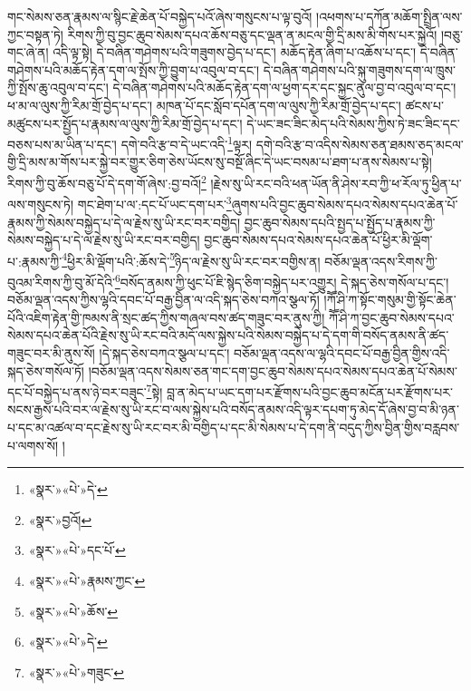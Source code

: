 གང་སེམས་ཅན་རྣམས་ལ་སྙིང་རྗེ་ཆེན་པོ་བསྐྱེད་པའོ་ཞེས་གསུངས་པ་ལྟ་བུའོ། །འཕགས་པ་དཀོན་མཆོག་སྤྲིན་ལས་ཀྱང་བསྟན་ཏེ། རིགས་ཀྱི་བུ་བྱང་ཆུབ་སེམས་དཔའ་ཆོས་བཅུ་དང་ལྡན་ན་མངལ་གྱི་དྲི་མས་མི་གོས་པར་སྐྱེའོ། །བཅུ་གང་ཞེ་ན། འདི་ལྟ་སྟེ། དེ་བཞིན་གཤེགས་པའི་གཟུགས་བྱེད་པ་དང་། མཆོད་རྟེན་ཞིག་པ་འཆོས་པ་དང་། དེ་བཞིན་གཤེགས་པའི་མཆོད་རྟེན་དག་ལ་སྤོས་ཀྱི་བྱུག་པ་འབུལ་བ་དང་། དེ་བཞིན་གཤེགས་པའི་སྐུ་གཟུགས་དག་ལ་ཁྲུས་ཀྱི་སྤོས་ཆུ་འབུལ་བ་དང་། དེ་བཞིན་གཤེགས་པའི་མཆོད་རྟེན་དག་ལ་ཕྱག་དར་དང་སྐྱང་ནུལ་བྱ་བ་འབུལ་བ་དང་། ཕ་མ་ལ་ལུས་ཀྱི་རིམ་གྲོ་བྱེད་པ་དང་། མཁན་པོ་དང་སློབ་དཔོན་དག་ལ་ལུས་ཀྱི་རིམ་གྲོ་བྱེད་པ་དང་། ཚངས་པ་མཚུངས་པར་སྤྱོད་པ་རྣམས་ལ་ལུས་ཀྱི་རིམ་གྲོ་བྱེད་པ་དང་། དེ་ཡང་ཟང་ཟིང་མེད་པའི་སེམས་ཀྱིས་ཏེ་ཟང་ཟིང་དང་བཅས་པས་མ་ཡིན་པ་དང་། དགེ་བའི་རྩ་བ་དེ་ཡང་འདི་\footnote{«སྣར་»«པེ་»དེ་}ལྟར། དགེ་བའི་རྩ་བ་འདིས་སེམས་ཅན་ཐམས་ཅད་མངལ་གྱི་དྲི་མས་མ་གོས་པར་སྐྱེ་བར་གྱུར་ཅིག་ཅེས་ཡོངས་སུ་བསྔོ་ཞིང་དེ་ཡང་བསམ་པ་ཐག་པ་ནས་སེམས་པ་སྟེ། རིགས་ཀྱི་བུ་ཆོས་བཅུ་པོ་དེ་དག་གོ་ཞེས་:བྱ་བའོ།\footnote{«སྣར་»བྱའོ།} །རྗེས་སུ་ཡི་རང་བའི་ཕན་ཡོན་ནི་ཤེས་རབ་ཀྱི་ཕ་རོལ་ཏུ་ཕྱིན་པ་ལས་གསུངས་ཏེ། གང་ཐེག་པ་ལ་:དང་པོ་ཡང་དག་པར་\footnote{«སྣར་»«པེ་»དང་པོ་}ཞུགས་པའི་བྱང་ཆུབ་སེམས་དཔའ་སེམས་དཔའ་ཆེན་པོ་རྣམས་ཀྱི་སེམས་བསྐྱེད་པ་དེ་ལ་རྗེས་སུ་ཡི་རང་བར་བགྱིད། བྱང་ཆུབ་སེམས་དཔའི་སྤྱད་པ་སྤྱོད་པ་རྣམས་ཀྱི་སེམས་བསྐྱེད་པ་དེ་ལ་རྗེས་སུ་ཡི་རང་བར་བགྱིད། བྱང་ཆུབ་སེམས་དཔའ་སེམས་དཔའ་ཆེན་པོ་ཕྱིར་མི་ལྡོག་པ་:རྣམས་ཀྱི་\footnote{«སྣར་»«པེ་»རྣམས་ཀྱང་}ཕྱིར་མི་ལྡོག་པའི་:ཆོས་དེ་\footnote{«སྣར་»«པེ་»ཆོས་}ཉིད་ལ་རྗེས་སུ་ཡི་རང་བར་བགྱིས་ན། བཅོམ་ལྡན་འདས་རིགས་ཀྱི་བུའམ་རིགས་ཀྱི་བུ་མོ་དེའི་\footnote{«སྣར་»«པེ་»དེ་}བསོད་ནམས་ཀྱི་ཕུང་པོ་ཇི་སྙེད་ཅིག་བསྐྱེད་པར་འགྱུར། དེ་སྐད་ཅེས་གསོལ་པ་དང་། བཅོམ་ལྡན་འདས་ཀྱིས་ལྷའི་དབང་པོ་བརྒྱ་བྱིན་ལ་འདི་སྐད་ཅེས་བཀའ་སྩལ་ཏོ། །ཀཽ་ཤི་ཀ་སྟོང་གསུམ་གྱི་སྟོང་ཆེན་པོའི་འཇིག་རྟེན་གྱི་ཁམས་ནི་སྲང་ཚད་ཀྱིས་གཞལ་བས་ཚད་གཟུང་བར་ནུས་ཀྱི། ཀཽ་ཤི་ཀ་བྱང་ཆུབ་སེམས་དཔའ་སེམས་དཔའ་ཆེན་པོའི་རྗེས་སུ་ཡི་རང་བའི་མདོ་ལས་སྐྱེས་པའི་སེམས་བསྐྱེད་པ་དེ་དག་གི་བསོད་ནམས་ནི་ཚད་གཟུང་བར་མི་ནུས་སོ། །དེ་སྐད་ཅེས་བཀའ་སྩལ་པ་དང་། བཅོམ་ལྡན་འདས་ལ་ལྷའི་དབང་པོ་བརྒྱ་བྱིན་གྱིས་འདི་སྐད་ཅེས་གསོལ་ཏོ། །བཅོམ་ལྡན་འདས་སེམས་ཅན་གང་དག་བྱང་ཆུབ་སེམས་དཔའ་སེམས་དཔའ་ཆེན་པོ་སེམས་དང་པོ་བསྐྱེད་པ་ནས་ཉེ་བར་བཟུང་\footnote{«སྣར་»«པེ་»གཟུང་}སྟེ། བླ་ན་མེད་པ་ཡང་དག་པར་རྫོགས་པའི་བྱང་ཆུབ་མངོན་པར་རྫོགས་པར་སངས་རྒྱས་པའི་བར་ལ་རྗེས་སུ་ཡི་རང་བ་ལས་སྐྱེས་པའི་བསོད་ནམས་འདི་ལྟར་དཔག་ཏུ་མེད་དོ་ཞེས་བྱ་བ་མི་ཉན་པ་དང་མ་འཚལ་བ་དང་རྗེས་སུ་ཡི་རང་བར་མི་བགྱིད་པ་དང་མི་སེམས་པ་དེ་དག་ནི་བདུད་ཀྱིས་བྱིན་གྱིས་བརླབས་པ་ལགས་སོ། །
